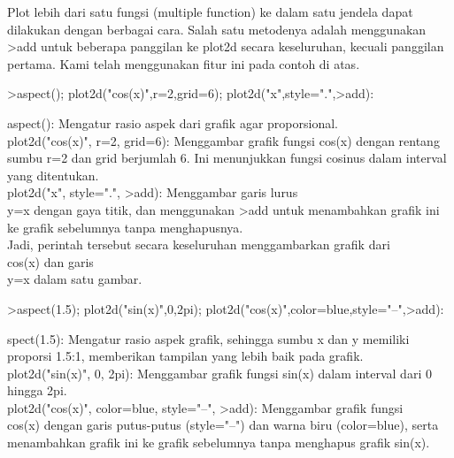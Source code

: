 \documentclass{article}
\begin{document}
\begin{eulernotebook}
\begin{eulercomment}
\begin{eulercomment}
\begin{eulercomment}
\begin{eulercomment}
\begin{eulercomment}
\begin{eulercomment}
\begin{eulercomment}
\begin{eulercomment}
\begin{eulercomment}
Plot lebih dari satu fungsi (multiple function) ke dalam satu jendela
dapat dilakukan dengan berbagai cara. Salah satu metodenya adalah
menggunakan \textgreater{}add untuk beberapa panggilan ke plot2d secara
keseluruhan, kecuali panggilan pertama. Kami telah menggunakan fitur
ini pada contoh di atas.
\end{eulercomment}
\begin{eulerprompt}
>aspect(); plot2d("cos(x)",r=2,grid=6); plot2d("x",style=".",>add):
\end{eulerprompt}
\begin{eulercomment}
aspect(): Mengatur rasio aspek dari grafik agar proporsional.\\
plot2d("cos(x)", r=2, grid=6): Menggambar grafik fungsi cos(x) dengan
rentang sumbu r=2 dan grid berjumlah 6. Ini menunjukkan fungsi cosinus
dalam interval yang ditentukan.\\
plot2d("x", style=".", \textgreater{}add): Menggambar garis lurus\\
y=x dengan gaya titik, dan menggunakan \textgreater{}add untuk menambahkan grafik
ini ke grafik sebelumnya tanpa menghapusnya.\\
Jadi, perintah tersebut secara keseluruhan menggambarkan grafik dari\\
cos(x) dan garis\\
y=x dalam satu gambar.
\end{eulercomment}
\begin{eulerprompt}
>aspect(1.5); plot2d("sin(x)",0,2pi); plot2d("cos(x)",color=blue,style="--",>add):
\end{eulerprompt}
\begin{eulercomment}
spect(1.5): Mengatur rasio aspek grafik, sehingga sumbu x dan y
memiliki proporsi 1.5:1, memberikan tampilan yang lebih baik pada
grafik.\\
plot2d("sin(x)", 0, 2pi): Menggambar grafik fungsi sin(x) dalam
interval dari 0 hingga 2pi.\\
plot2d("cos(x)", color=blue, style="--", \textgreater{}add): Menggambar grafik
fungsi\\
cos(x) dengan garis putus-putus (style="--") dan warna biru
(color=blue), serta menambahkan grafik ini ke grafik sebelumnya tanpa
menghapus grafik sin(x).


\end{eulercomment}
\end{eulercomment}
\end{eulercomment}
\end{eulercomment}
\end{eulercomment}
\end{eulercomment}
\end{eulercomment}
\end{eulercomment}
\end{eulercomment}
\end{eulernotebook}
\end{document}
